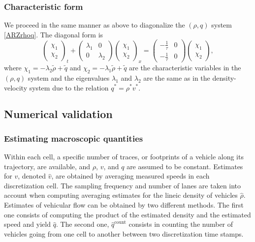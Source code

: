 \documentclass[a4paper, 10pt, conference]{ieeeconf}      %
\begin{document}
\subsubsection{Characteristic form}
We proceed in the same manner as above to diagonalize the $(\rho,q)$ system \eqref{ARZrhoq}. The diagonal form is
{\footnotesize
\begin{equation} \label{rhoqlindiag}
\begin{pmatrix}
	\chi_1 \\ 
	\chi_2
\end{pmatrix}_t 
+
\begin{pmatrix}
	\lambda_1 & 0 \\
	0 & \lambda_2
\end{pmatrix}
\begin{pmatrix}
	\chi_1 \\ 
	\chi_2
\end{pmatrix}_x
= 
\begin{pmatrix}
	-\frac{1}{\tau} & 0 \\
	-\frac{1}{\tau} & 0
\end{pmatrix}
\begin{pmatrix}
\chi_1 \\ \chi_2
\end{pmatrix},
\end{equation}
}
where $\chi_1 = -\lambda_2 \tilde{\rho} + \tilde{q}$ and $\chi_2 = -\lambda_1 \tilde{\rho} + \tilde{q}$ are the characteristic variables in the $(\rho,q)$ system and the eigenvalues $\lambda_1$ and $\lambda_2$ are the same as in the density-velocity system due to the relation $q^* = \rho^*v^*$.


\subsection{Numerical validation}

\subsubsection{Estimating macroscopic quantities}
Within each cell, a specific number of traces, or footprints of a vehicle along its trajectory, are available, and $\rho$, $v$, and $q$ are assumed to be constant. Estimates for $v$, denoted $\hat{v}$, are obtained by averaging measured speeds in each discretization cell. The sampling frequency and number of lanes are taken into account when computing averaging estimates for the lineic density of vehicles $\hat{\rho}$. Estimates of vehicular flow can be obtained by two different methods. The first one consists of computing the product of the estimated density and the estimated speed and yield $\hat{q}$. The second one, $\hat{q}^{\text{count}}$ consists in counting the number of vehicles going from one cell to another between two discretization time stamps.
\end{document}
